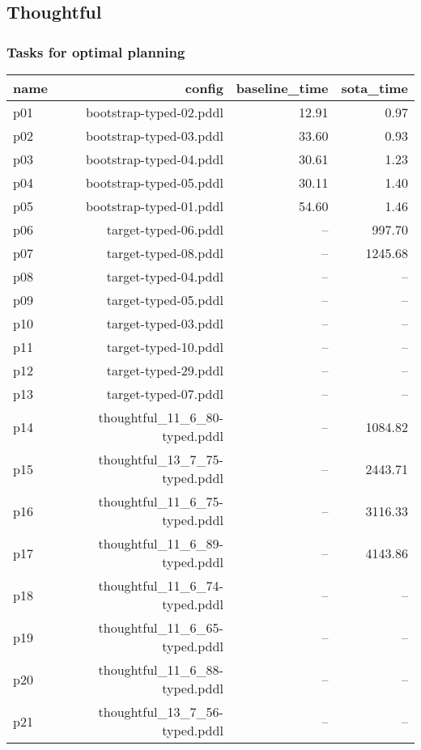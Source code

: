 \documentclass{article}
\begin{document}
                \newpage \subsection{Thoughtful}
                    \subsubsection*{Tasks for optimal planning}
                    
                            \begin{center}
                            \scriptsize
                            \begin{tabular}{@{}l|r|r|r@{}}
                            name & config & baseline\_time & sota\_time\\\midrule
                              p01& bootstrap-typed-02.pddl&12.91&0.97\\
  p02& bootstrap-typed-03.pddl&33.60&0.93\\
  p03& bootstrap-typed-04.pddl&30.61&1.23\\
  p04& bootstrap-typed-05.pddl&30.11&1.40\\
  p05& bootstrap-typed-01.pddl&54.60&1.46\\
  p06& target-typed-06.pddl&--&997.70\\
  p07& target-typed-08.pddl&--&1245.68\\
  p08& target-typed-04.pddl&--&--\\
  p09& target-typed-05.pddl&--&--\\
  p10& target-typed-03.pddl&--&--\\
  p11& target-typed-10.pddl&--&--\\
  p12& target-typed-29.pddl&--&--\\
  p13& target-typed-07.pddl&--&--\\
  p14& thoughtful\_11\_6\_80-typed.pddl&--&1084.82\\
  p15& thoughtful\_13\_7\_75-typed.pddl&--&2443.71\\
  p16& thoughtful\_11\_6\_75-typed.pddl&--&3116.33\\
  p17& thoughtful\_11\_6\_89-typed.pddl&--&4143.86\\
  p18& thoughtful\_11\_6\_74-typed.pddl&--&--\\
  p19& thoughtful\_11\_6\_65-typed.pddl&--&--\\
  p20& thoughtful\_11\_6\_88-typed.pddl&--&--\\
  p21& thoughtful\_13\_7\_56-typed.pddl&--&--\\

\end{tabular}
\end{center}
\end{document}
